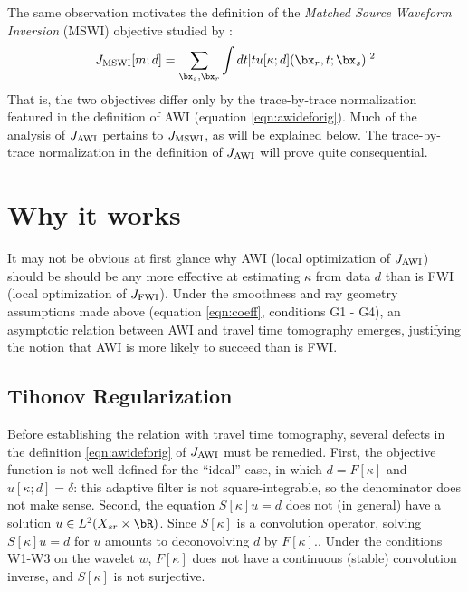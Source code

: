 The same observation motivates the definition of the {\em Matched
  Source Waveform Inversion} (MSWI) objective studied by
\cite{HuangSymes2015SEG,HuangSymes:Geo17}:
\begin{equation}
  \label{eqn:mswideforig}
  J_{\rm MSWI}[m;d] = \sum_{\bx_s,\bx_r} \int dt |tu[\kappa;d](\bx_r,t;\bx_s)|^2
\end{equation}
That is, the two objectives differ only by the trace-by-trace
normalization featured in the definition of AWI (equation
\ref{eqn:awideforig}). Much of the analysis of $J_{\rm AWI}$ pertains to
$J_{\rm MSWI}$, as will be explained below.
The trace-by-trace normalization in the definition of $J_{\rm AWI}$
will prove quite consequential.

\section{Why it works}

It may not be obvious at first glance why AWI (local optimization of
$J_{\rm AWI}$) should be should be any more effective at estimating
$\kappa$ from data $d$ than is FWI (local
optimization of $J_{\rm FWI}$). Under the smoothness and ray geometry assumptions made above (equation
\ref{eqn:coeff}, conditions G1 - G4), an asymptotic relation
between AWI and travel time tomography emerges, justifying the notion
that AWI is more likely to succeed than is FWI.

\subsection{Tihonov Regularization}
Before establishing the relation with travel time tomography, several
defects in the definition \ref{eqn:awideforig} of $J_{\rm AWI}$ must be
remedied. First, the objective function is not well-defined for the
``ideal'' case, in which $d = F[\kappa]$ and $u[\kappa;d]=\delta$:
this adaptive filter is not square-integrable, so the denominator does
not make sense. Second, the equation $S[\kappa]u=d$ does not (in
general) have a solution $u \in L^2(X_{sr} \times \bR)$. Since
$S[\kappa]$ is a convolution operator, solving $S[\kappa]u=d$ for $u$
amounts to deconovolving $d$ by $F[\kappa]$..  Under the conditions
W1-W3 on the wavelet $w$, $F[\kappa]$ does not have a continuous
(stable) convolution inverse, and $S[\kappa]$ is not surjective.

